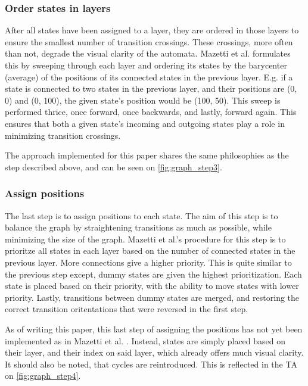 \subsubsection{Order states in layers}
After all states have been assigned to a layer, they are ordered in those layers to ensure the smallest number of transition crossings. These crossings, more often than not, degrade the visual clarity of the automata.
Mazetti et al. formulates this by sweeping through each layer and ordering its states by the barycenter (average) of the positions of its connected states in the previous layer.
E.g. if a state is connected to two states in the previous layer, and their positions are (0, 0) and (0, 100), the given state's position would be (100, 50).
This sweep is performed thrice, once forward, once backwards, and lastly, forward again.
This ensures that both a given state's incoming and outgoing states play a role in minimizing transition crossings. \cite{Mazetti2012}

The approach implemented for this paper shares the same philosophies as the step described above, and can be seen on \cref{fig:graph_step3}.
\begin{center}
    
\end{center}

\subsubsection{Assign positions}
The last step is to assign positions to each state. The aim of this step is to balance the graph by straightening transitions as much as possible, while minimizing the size of the graph.
Mazetti et al.'s procedure for this step is to prioritze all states in each layer based on the number of connected states in the previous layer.
More connections give a higher priority. This is quite similar to the previous step except, dummy states are given the highest prioritization.
Each state is placed based on their priority, with the ability to move states with lower priority.
Lastly, transitions between dummy states are merged, and restoring the correct transition oritentations that were reversed in the first step. \cite{Mazetti2012}

As of writing this paper, this last step of assigning the positions has not yet been implemented as in Mazetti et al. \cite{Mazetti2012}. Instead, states are simply placed based on their layer, and their index on said layer, which already offers much visual clarity. It should also be noted, that cycles are reintroduced. This is reflected in the TA on \cref{fig:graph_step4}.

\begin{center}
    
\end{center}
